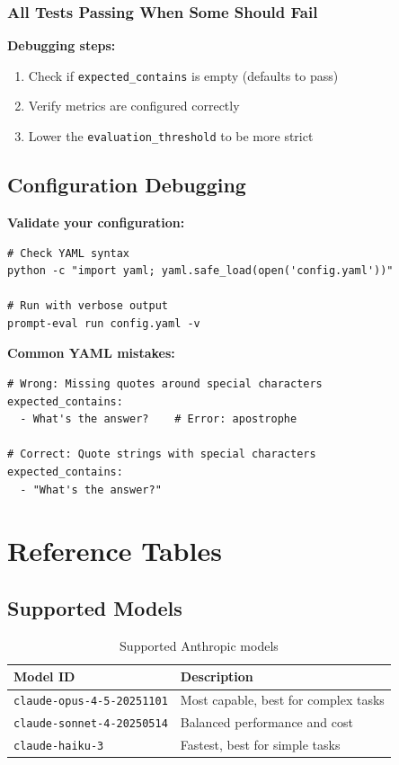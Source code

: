 \documentclass[11pt,a4paper]{report}
\begin{document}
\subsection{All Tests Passing When Some Should Fail}

\textbf{Debugging steps:}
\begin{enumerate}
    \item Check if \texttt{expected\_contains} is empty (defaults to pass)
    \item Verify metrics are configured correctly
    \item Lower the \texttt{evaluation\_threshold} to be more strict
\end{enumerate}

\section{Configuration Debugging}

\textbf{Validate your configuration:}
\begin{lstlisting}[style=bash]
# Check YAML syntax
python -c "import yaml; yaml.safe_load(open('config.yaml'))"

# Run with verbose output
prompt-eval run config.yaml -v
\end{lstlisting}

\textbf{Common YAML mistakes:}
\begin{lstlisting}[style=yaml]
# Wrong: Missing quotes around special characters
expected_contains:
  - What's the answer?    # Error: apostrophe

# Correct: Quote strings with special characters
expected_contains:
  - "What's the answer?"
\end{lstlisting}


\appendix

\chapter{Reference Tables}

\section{Supported Models}

\begin{table}[h]
\centering
\begin{tabular}{@{}lp{8cm}@{}}
\toprule
\textbf{Model ID} & \textbf{Description} \\
\midrule
\texttt{claude-opus-4-5-20251101} & Most capable, best for complex tasks \\
\texttt{claude-sonnet-4-20250514} & Balanced performance and cost \\
\texttt{claude-haiku-3} & Fastest, best for simple tasks \\
\bottomrule
\end{tabular}
\caption{Supported Anthropic models}
\end{table}
\end{document}
